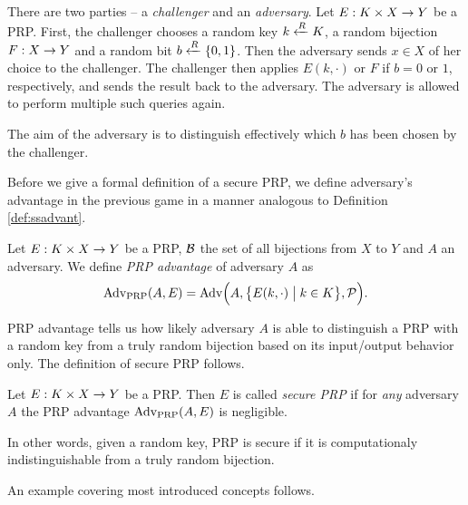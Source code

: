 \begin{game}
\label{game:prp}
	There are two parties -- a {\em challenger} and an {\em adversary}. Let $E:K\times X\rightarrow Y$ be a PRP. First, the challenger chooses a random key $k\xleftarrow{R} K$, a random bijection $F:X\rightarrow Y$ and a random bit $b\xleftarrow{R}\{0,1\}$. Then the adversary sends $x\in X$ of her choice to the challenger. The challenger then applies $E(k,\cdot)$ or $F$ if $b=0$ or $1$, respectively, and sends the result back to the adversary. The adversary is allowed to perform multiple such queries again.
	
	The aim of the adversary is to distinguish effectively which $b$ has been chosen by the challenger.
\end{game}

Before we give a formal definition of a secure PRP, we define adversary's advantage in the previous game in a manner analogous to Definition \ref{def:ssadvant}.

\begin{defn}
\label{def:prpadvant}
	Let $E: K\times X\rightarrow Y$ be a PRP, $\cal B$ the set of all bijections from $X$ to $Y$ and $A$ an adversary. We define {\em PRP advantage} of adversary $A$ as
	\[
		\operatorname*{Adv_{PRP}}(A,E) = \operatorname*{Adv}\Bigl(A,\bigl\{E(k,\cdot)\bigm|k\in K\bigr\},{\cal P}\Bigr) .
	\]
\end{defn}

PRP advantage tells us how likely adversary $A$ is able to distinguish a PRP with a random key from a truly random bijection based on its input/output behavior only. The definition of secure PRP follows.

\begin{defn}
\label{def:secprp}
	Let $E: K\times X\rightarrow Y$ be a PRP. Then $E$ is called {\em secure PRP} if for {\em any} adversary $A$ the PRP advantage $\operatorname*{Adv_{PRP}}(A,E)$ is negligible.
\end{defn}

In other words, given a random key, PRP is secure if it is computationaly indistinguishable from a truly random bijection. 

An example covering most introduced concepts follows.

